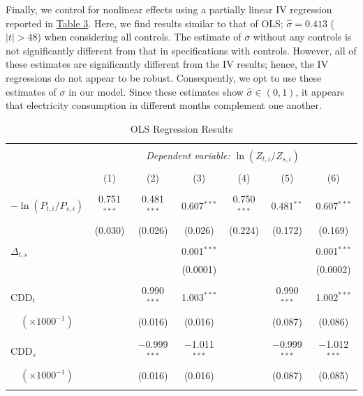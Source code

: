 \documentclass[11pt,a4paper]{extarticle}
\begin{document}
Finally, we control for nonlinear effects using a partially linear IV regression reported in \hyperref[table:3]{Table 3}. Here, we find results similar to that of OLS; $\hat{\sigma} = 0.413$ ($|t| > 48$) when considering all controls. The estimate of $\sigma$ without any controls is not significantly different from that in specifications with controls. However, all of these estimates are significantly different from the IV results; hence, the IV regressions do not appear to be robust. Consequently, we opt to use these estimates of $\sigma$ in our model. Since these estimates show $\hat{\sigma} \in (0,1)$, it appears that electricity consumption in different months complement one another. 

\begin{table}[!htbp] \centering 
	\caption{OLS Regression Results}
	\label{table:1} 
	\small
	\begin{tabular}{@{\extracolsep{5pt}}lcccccc} 
		\\[-4ex]\hline  
		\hline \\[-1.8ex] 
		& \multicolumn{6}{c}{\textit{Dependent variable:} $\ln (Z_{ t, i} / Z_{ s, i})$} \\ [0.5ex]
		\cline{2-7} 
		\\[-1.8ex] & (1) & (2) & (3) & (4) & (5) & (6)\\ [0.5ex]
		\hline \\[-1.8ex] 
		$-\ln (P_{t,i} / P_{s,i})$ & 0.751$^{***}$ & 0.481$^{***}$ & 0.607$^{***}$ & 0.750$^{***}$ & 0.481$^{**}$ & 0.607$^{***}$ \\ 
		& (0.030) & (0.026) & (0.026) & (0.224) & (0.172) & (0.169) \\ 
		& & & & & & \\ 
		$\Delta_{t,s}$ &  &  & 0.001$^{***}$ &  &  & 0.001$^{***}$ \\ 
		&  &  & (0.0001) &  &  & (0.0002) \\ 
		& & & & & & \\ 
		CDD$_t$ &  & 0.990$^{***}$ & 1.003$^{***}$ &  & 0.990$^{***}$ & 1.002$^{***}$ \\ 
		$\quad(\times 1000^{-1})$&  & (0.016) & (0.016) &  & (0.087) & (0.086) \\ 
		& & & & & & \\ 
		CDD$_s$ &  & $-$0.999$^{***}$ & $-$1.011$^{***}$ &  & $-$0.999$^{***}$ & $-$1.012$^{***}$ \\ 
		$\quad(\times 1000^{-1})$&  & (0.016) & (0.016) &  & (0.087) & (0.085) \\ 
		& & & & & & \\ 

\end{tabular}
\end{table}
\end{document}
